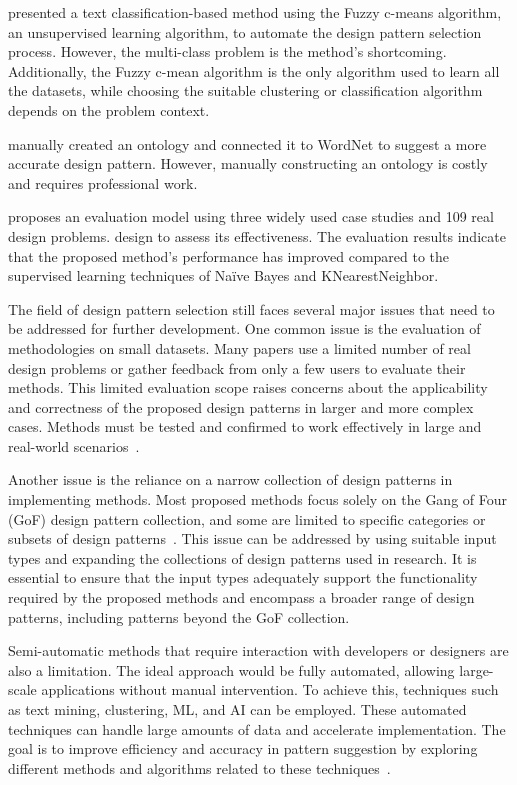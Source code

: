\textcite{Hussain2019automated} presented a text classification-based method using the Fuzzy c-means algorithm, an unsupervised learning algorithm, to automate the design pattern selection process. However, the multi-class problem is the method's shortcoming. Additionally, the Fuzzy c-mean algorithm is the only algorithm used to learn all the datasets, while choosing the suitable clustering or classification algorithm depends on the problem context.

\textcite{Naghdipour2021} manually created an ontology and connected it to WordNet to suggest a more accurate design pattern. However, manually constructing an ontology is costly and requires professional work.

\textcite{Naghdipour2023Semi} proposes an evaluation model using three widely used case studies and 109 real design problems. design to assess its effectiveness. The evaluation results indicate that the proposed method's performance has improved compared to the supervised learning techniques of Naïve Bayes and KNearestNeighbor.

The field of design pattern selection still faces several major issues that need to be addressed for further development. One common issue is the evaluation of methodologies on small datasets. Many papers use a limited number of real design problems or gather feedback from only a few users to evaluate their methods. This limited evaluation scope raises concerns about the applicability and correctness of the proposed design patterns in larger and more complex cases. Methods must be tested and confirmed to work effectively in large and real-world scenarios~\cite{Naghdipour2023}.

Another issue is the reliance on a narrow collection of design patterns in implementing methods. Most proposed methods focus solely on the Gang of Four (GoF) design pattern collection, and some are limited to specific categories or subsets of design patterns~\cite{Schumacher2013}. This issue can be addressed by using suitable input types and expanding the collections of design patterns used in research. It is essential to ensure that the input types adequately support the functionality required by the proposed methods and encompass a broader range of design patterns, including patterns beyond the GoF collection.

Semi-automatic methods that require interaction with developers or designers are also a limitation. The ideal approach would be fully automated, allowing large-scale applications without manual intervention. To achieve this, techniques such as text mining, clustering, \ac{ML}, and AI can be employed. These automated techniques can handle large amounts of data and accelerate implementation. The goal is to improve efficiency and accuracy in pattern suggestion by exploring different methods and algorithms related to these techniques~\cite {Naghdipour2023}.

